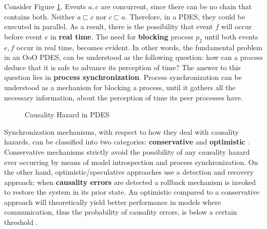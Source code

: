 \documentclass[11pt]{article}
\begin{document}
Consider Figure \ref{fig:hazard}.
Events \(a,c\) are concurrent, since there can be no chain that contains both.
Neither \(a \sqsubset c\) nor \(c \sqsubset a\).
Therefore, in a PDES, they could be executed in parallel.
As a result, there is the possibility that event \(f\) will occur before event \(e\) in \textbf{real time}.
The need for \textbf{blocking} process \(p_2\) until both events \(e,f\) occur in real time, becomes evident.
In other words, the fundamental problem in an OoO PDES, can be understood as the following question: how can a process deduce that it is safe to advance its perception of time?
The answer to this question lies in \textbf{process synchronization}.
Process synchronization can be understood as a mechanism for blocking a process, until it gathers all the necessary information, about the perception of time its peer processes have.

\begin{figure}[htpb]
\centering
{}
\caption{Causality Hazard in PDES} 
\label{fig:hazard}
\end{figure}

Synchronization mechanisms, with respect to how they deal with causality hazards, can be classified into two categories: \textbf{conservative} and \textbf{optimistic} \cite{Fujimoto2015}.
Conservative mechanisms strictly avoid the possibility of any causality hazard ever occurring by means of model introspection and process synchronization.
On the other hand, optimistic/speculative approaches use a detection and recovery approach: when \textbf{causality errors} are detected a rollback mechanism is invoked to restore the system in its prior state.
An optimistic compared to a conservative approach will theoretically yield better performance in models where communication, thus the probability of causality errors, is below a certain threshold \cite{Fujimoto1990}.
\end{document}
